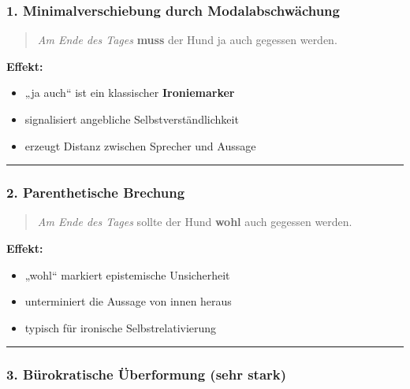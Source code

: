 \documentclass[
  letterpaper,
  DIV=11,
  numbers=noendperiod]{scrartcl}
\providecommand{\tightlist}{%
  \setlength{\itemsep}{0pt}\setlength{\parskip}{0pt}}
\begin{document}
\subsubsection{1. Minimalverschiebung durch
Modalabschwächung}\label{minimalverschiebung-durch-modalabschwuxe4chung}

\begin{quote}
\emph{Am Ende des Tages} \textbf{muss} der Hund ja auch gegessen werden.
\end{quote}

\textbf{Effekt:}

\begin{itemize}
\tightlist
\item
  „ja auch`` ist ein klassischer \textbf{Ironiemarker}
\item
  signalisiert angebliche Selbstverständlichkeit
\item
  erzeugt Distanz zwischen Sprecher und Aussage
\end{itemize}

\begin{center}\rule{0.5\linewidth}{0.5pt}\end{center}

\subsubsection{2. Parenthetische
Brechung}\label{parenthetische-brechung}

\begin{quote}
\emph{Am Ende des Tages} sollte der Hund \textbf{wohl} auch gegessen
werden.
\end{quote}

\textbf{Effekt:}

\begin{itemize}
\tightlist
\item
  „wohl`` markiert epistemische Unsicherheit
\item
  unterminiert die Aussage von innen heraus
\item
  typisch für ironische Selbstrelativierung
\end{itemize}

\begin{center}\rule{0.5\linewidth}{0.5pt}\end{center}

\subsubsection{3. Bürokratische Überformung (sehr
stark)}\label{buxfcrokratische-uxfcberformung-sehr-stark}
\end{document}
